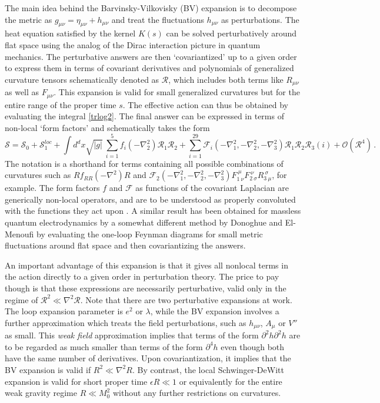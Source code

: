 \documentclass[12pt,a4paper]{article}
\newcommand{\be}{\begin{equation}}
\newcommand{\ee}{\end{equation}}
\newcommand{\cS}{\mathcal{S}}
\newcommand{\cR}{\mathcal{R}}
\newcommand{\e}{\epsilon}
\newcommand{\m}{\mu}
\newcommand{\n}{\nu}
\newcommand{\1}{{\textbf{1}}}
\newcommand{\+}{{\,+ \,}}
\begin{document}
The main idea behind the Barvinsky-Vilkovisky (BV) expansion is to  decompose the metric as $g_{\m\n}= \eta_{\m\n} + h_{\m\n}$ and  treat the fluctuations $h_{\m\n}$    as perturbations. The heat equation satisfied by the kernel $K(s)$  can  be solved perturbatively around flat space using the analog of  the Dirac interaction picture in quantum mechanics. The perturbative answers are then `covariantized’ up to a given order to express them in terms of covariant derivatives  and polynomials of generalized curvature tensors  schematically denoted as $\mathcal{R}$, which includes both terms like  $R_{\mu\nu}$ as well as $F_{\mu\nu}$.  This expansion is  valid for small generalized curvatures but for the entire range of the  proper time $s$. The effective action can thus  be obtained by evaluating the  integral \eqref{trlog2}. The final answer can be expressed in terms of non-local `form factors’ and schematically takes  the  form
\be\label{BVresult}
\cS =  \cS_0+ \cS_1^{loc}+\int d^dx\sqrt{|g|}\  \sum_{i=1}^{5}f_i(-\nabla^2_2)\mathcal{R}_1\mathcal{R}_2 + \sum_{i=1}^{29}\mathcal{F}_i(-\nabla^{2}_1,-\nabla^{2}_2,-\nabla^{2}_3)\mathcal{R}_1\mathcal{R}_2\mathcal{R}_3(i) +\mathcal{O}(\mathcal{R}^4) \, .
\ee
The notation is a shorthand for terms containing all possible combinations of curvatures such as $Rf_{RR}(-\nabla^2)R$ and $\mathcal{F}_2(-\nabla^2_1,-\nabla^2_2,-\nabla^2_3)F^{\ \mu}_{1\ \nu}F^{\ \nu}_{2\ \sigma}R^{\ \sigma}_{3\ \mu}$, for example.
The form factors $f$ and $\mathcal{F}$ as functions of the covariant Laplacian are generically non-local operators,  and are to be understood as properly convoluted with the functions they act upon \cite{Barvinsky:1985an}.
A similar result has been obtained for massless quantum electrodynamics by a somewhat different method   by Donoghue and El-Menoufi \cite{Donoghue:2015nba,Donoghue:2015xla} by evaluating the one-loop Feynman diagrams for small metric fluctuations around flat space and then covariantizing the answers. 

An important advantage of this expansion is that it gives all nonlocal terms in the action directly to a given order in perturbation theory. The  price to pay though is that these expressions are necessarily perturbative, valid only in the regime of 
$\cR^{2} \ll \nabla^{2} \cR  $. 
Note that there are two perturbative expansions at work. The loop expansion parameter is $e^2$ or $\lambda$, while the BV expansion involves a further  approximation which treats the field perturbations, such as $h_{\m\n}$, $A_\mu$ or $V''$ as small. This \textit{weak field} approximation implies that  terms of the form $\partial^{2} h \partial^{2} h$ are  to be regarded as much smaller than terms of the form $\partial^{4}h$ even though both have the same number of derivatives. Upon covariantization, it implies that the BV expansion is valid if $ R^2 \ll \nabla^2 R$. By contrast, the local Schwinger-DeWitt expansion is valid for short proper time $\e R \ll 1$ or equivalently for the  entire weak gravity regime $R \ll M_{0}^{2}$  without any further restrictions on curvatures. 
\end{document}
